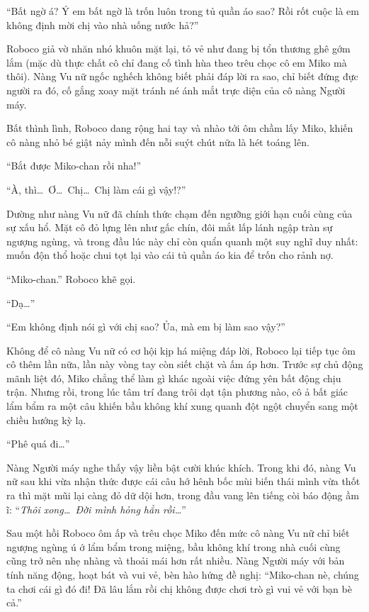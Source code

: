 \documentclass[../main.tex]{subfiles}
\begin{document}
``Bất ngờ á? Ý em bất ngờ là trốn luôn trong tủ quần áo sao? Rồi rốt cuộc là em không định mời chị vào nhà uống nước hả?''


Roboco giả vờ nhăn nhó khuôn mặt lại, tỏ vẻ như đang bị tổn thương ghê gớm lắm (mặc dù thực chất cô chỉ đang cố tình hùa theo trêu chọc cô em Miko mà thôi). Nàng Vu nữ ngốc nghếch không biết phải đáp lời ra sao, chỉ biết đứng đực người ra đó, cố gắng xoay mặt tránh né ánh mắt trực diện của cô nàng Người máy.

Bất thình lình, Roboco dang rộng hai tay và nhào tới ôm chầm lấy Miko, khiến cô nàng nhỏ bé giật nảy mình đến nỗi suýt chút nữa là hét toáng lên.

``Bắt được Miko-chan rồi nha!''

``À, thì\dots\ Ơ\dots\ Chị\dots\ Chị làm cái gì vậy!?''

Dường như nàng Vu nữ đã chính thức chạm đến ngưỡng giới hạn cuối cùng của sự xấu hổ. Mặt cô đỏ lựng lên như gấc chín, đôi mắt lấp lánh ngập tràn sự ngượng ngùng, và trong đầu lúc này chỉ còn quẩn quanh một suy nghĩ duy nhất: muốn độn thổ hoặc chui tọt lại vào cái tủ quần áo kia để trốn cho rảnh nợ.

``Miko-chan.'' Roboco khẽ gọi.

``Dạ\dots''

``Em không định nói gì với chị sao? Ủa, mà em bị làm sao vậy?''


Không để cô nàng Vu nữ có cơ hội kịp há miệng đáp lời, Roboco lại tiếp tục ôm cô thêm lần nữa, lần này vòng tay còn siết chặt và ấm áp hơn. Trước sự chủ động mãnh liệt đó, Miko chẳng thể làm gì khác ngoài việc đứng yên bất động chịu trận. Nhưng rồi, trong lúc tâm trí đang trôi dạt tận phương nào, cô ả bất giác lẩm bẩm ra một câu khiến bầu không khí xung quanh đột ngột chuyển sang một chiều hướng kỳ lạ.

``Phê quá đi\dots''

Nàng Người máy nghe thấy vậy liền bật cười khúc khích. Trong khi đó, nàng Vu nữ sau khi vừa nhận thức được cái câu hớ hênh bốc mùi biến thái mình vừa thốt ra thì mặt mũi lại càng đỏ dữ dội hơn, trong đầu vang lên tiếng còi báo động ầm ĩ: ``\textit{Thôi xong\dots\ Đời mình hỏng hẳn rồi\dots}''

\ct

Sau một hồi Roboco ôm ấp và trêu chọc Miko đến mức cô nàng Vu nữ chỉ biết ngượng ngùng ú ớ lẩm bẩm trong miệng, bầu không khí trong nhà cuối cùng cũng trở nên nhẹ nhàng và thoải mái hơn rất nhiều. Nàng Người máy với bản tính năng động, hoạt bát và vui vẻ, bèn hào hứng đề nghị: ``Miko-chan nè, chúng ta chơi cái gì đó đi! Đã lâu lắm rồi chị không được chơi trò gì vui vẻ với bạn bè cả.''
\end{document}
